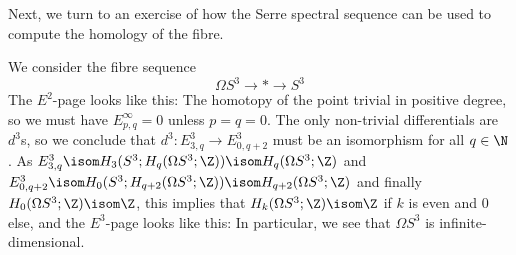 \documentclass[wip, topology]{bsteffan-lecturenotes}
\begin{document}
Next, we turn to an exercise of how the Serre spectral sequence can be used to compute the homology of the fibre.
\begin{example}
	We consider the fibre sequence
	\begin{equation*}
		\Omega S^3 \to * \to S^3
	\end{equation*}
	The $E^2$-page looks like this:
	The homotopy of the point trivial in positive degree, so we must have $E^\infty_{p, q} = 0$ unless $p = q = 0$.
	The only non-trivial differentials are $d^3$s, so we conclude that $d^3\colon E^3_{3, q} \to E^3_{0, q + 2}$ must be an isomorphism for all $q \in \N$.
	As $E^3_{3, q} \isom H_3(S^3; H_q(\Omega S^3; \Z)) \isom H_q(\Omega S^3; \Z)$ and $E^3_{0, q + 2} \isom H_0(S^3; H_{q + 2}(\Omega S^3; \Z)) \isom H_{q + 2}(\Omega S^3; \Z)$ and finally $H_0(\Omega S^3; \Z) \isom \Z$, this implies that $H_k(\Omega S^3; \Z) \isom \Z$ if $k$ is even and 0 else, and the $E^3$-page looks like this:
	In particular, we see that $\Omega S^3$ is infinite-dimensional.
\end{example}
\end{document}
